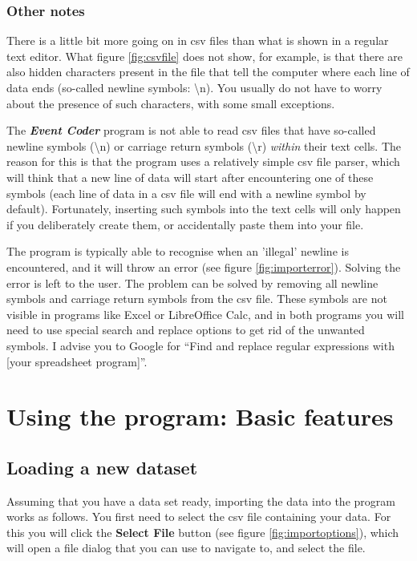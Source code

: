 \documentclass{memoir}
\begin{document}
\subsection{Other notes}
\label{sec:othernotesdatasets}

There is a little bit more going on in csv files than what is shown in a regular text editor. What figure \ref{fig:csvfile} does not show, for example, is that there are also hidden characters present in the file that tell the computer where each line of data ends (so-called newline symbols: \textbackslash n). You usually do not have to worry about the presence of such characters, with some small exceptions. 

The \emph{\textbf{Event Coder}} program is not able to read csv files that have so-called newline symbols (\textbackslash n) or carriage return symbols (\textbackslash r) \emph{within} their text cells. The reason for this is that the program uses a relatively simple csv file parser, which will think that a new line of data will start after encountering one of these symbols (each line of data in a csv file will end with a newline symbol by default). Fortunately, inserting such symbols into the text cells will only happen if you deliberately create them, or accidentally paste them into your file. 

The program is typically able to recognise when an 'illegal' newline is encountered, and it will throw an error (see figure \ref{fig:importerror}). Solving the error is left to the user. The problem can be solved by removing all newline symbols and carriage return symbols from the csv file. These symbols are not visible in programs like Excel or LibreOffice Calc, and in both programs you will need to use special search and replace options to get rid of the unwanted symbols. I advise you to Google for ``Find and replace regular expressions with [your spreadsheet program]''. 

\chapter{Using the program: Basic features}
\label{chap:usingtheprogram}

\section{Loading a new dataset}
\label{sec:loadingnewdataset}

Assuming that you have a data set ready, importing the data into the program works as follows. You first need to select the csv file containing your data. For this you will click the \textbf{Select File} button (see figure \ref{fig:importoptions}), which will open a file dialog that you can use to navigate to, and select the file.
\end{document}
